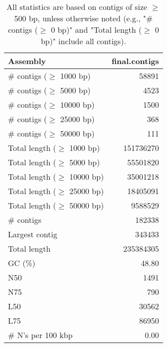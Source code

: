 \documentclass[12pt,a4paper]{article}
\begin{document}
\begin{table}[ht]
\begin{center}
\caption{All statistics are based on contigs of size $\geq$ 500 bp, unless otherwise noted (e.g., "\# contigs ($\geq$ 0 bp)" and "Total length ($\geq$ 0 bp)" include all contigs).}
\begin{tabular}{|l*{1}{|r}|}
\hline
Assembly & final.contigs \\ \hline
\# contigs ($\geq$ 1000 bp) & 58891 \\ \hline
\# contigs ($\geq$ 5000 bp) & 4523 \\ \hline
\# contigs ($\geq$ 10000 bp) & 1500 \\ \hline
\# contigs ($\geq$ 25000 bp) & 368 \\ \hline
\# contigs ($\geq$ 50000 bp) & 111 \\ \hline
Total length ($\geq$ 1000 bp) & 151736270 \\ \hline
Total length ($\geq$ 5000 bp) & 55501820 \\ \hline
Total length ($\geq$ 10000 bp) & 35001218 \\ \hline
Total length ($\geq$ 25000 bp) & 18405091 \\ \hline
Total length ($\geq$ 50000 bp) & 9588529 \\ \hline
\# contigs & 182338 \\ \hline
Largest contig & 343433 \\ \hline
Total length & 235384305 \\ \hline
GC (\%) & 48.80 \\ \hline
N50 & 1491 \\ \hline
N75 & 790 \\ \hline
L50 & 30562 \\ \hline
L75 & 86950 \\ \hline
\# N's per 100 kbp & 0.00 \\ \hline
\end{tabular}
\end{center}
\end{table}
\end{document}
